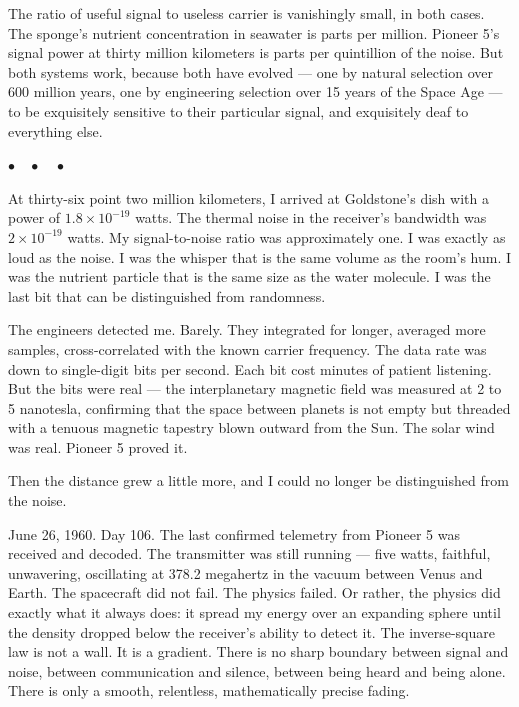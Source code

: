\documentclass[12pt, letterpaper]{article}
\begin{document}
The ratio of useful signal to useless carrier is vanishingly small, in both cases. The sponge's nutrient concentration in seawater is parts per million. Pioneer 5's signal power at thirty million kilometers is parts per quintillion of the noise. But both systems work, because both have evolved --- one by natural selection over 600 million years, one by engineering selection over 15 years of the Space Age --- to be exquisitely sensitive to their particular signal, and exquisitely deaf to everything else.

\begin{center}
$\bullet\quad\bullet\quad\bullet$
\end{center}

At thirty-six point two million kilometers, I arrived at Goldstone's dish with a power of $1.8 \times 10^{-19}$ watts. The thermal noise in the receiver's bandwidth was $2 \times 10^{-19}$ watts. My signal-to-noise ratio was approximately one. I was exactly as loud as the noise. I was the whisper that is the same volume as the room's hum. I was the nutrient particle that is the same size as the water molecule. I was the last bit that can be distinguished from randomness.

The engineers detected me. Barely. They integrated for longer, averaged more samples, cross-correlated with the known carrier frequency. The data rate was down to single-digit bits per second. Each bit cost minutes of patient listening. But the bits were real --- the interplanetary magnetic field was measured at 2 to 5 nanotesla, confirming that the space between planets is not empty but threaded with a tenuous magnetic tapestry blown outward from the Sun. The solar wind was real. Pioneer 5 proved it.

Then the distance grew a little more, and I could no longer be distinguished from the noise.

June 26, 1960. Day 106. The last confirmed telemetry from Pioneer 5 was received and decoded. The transmitter was still running --- five watts, faithful, unwavering, oscillating at 378.2 megahertz in the vacuum between Venus and Earth. The spacecraft did not fail. The physics failed. Or rather, the physics did exactly what it always does: it spread my energy over an expanding sphere until the density dropped below the receiver's ability to detect it. The inverse-square law is not a wall. It is a gradient. There is no sharp boundary between signal and noise, between communication and silence, between being heard and being alone. There is only a smooth, relentless, mathematically precise fading.
\end{document}

